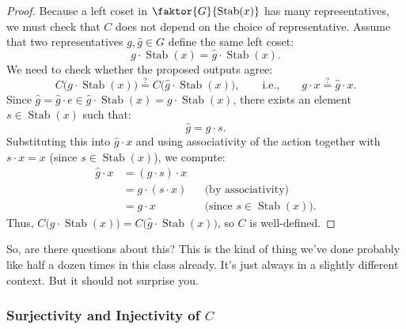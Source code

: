 \begin{proofWrapper}
\begin{content}
\begin{proof}
Because a left coset in $\faktor{G}{\operatorname{Stab}(x)}$ has many representatives, we must check that $C$ does not depend on the choice of representative. Assume that two representatives $g, \hat{g} \in G$ define the same left coset:
\[
g \cdot \operatorname{Stab}(x) = \hat{g} \cdot \operatorname{Stab}(x).
\]
We need to check whether the proposed outputs agree:
\[
C\bigl(g \cdot \operatorname{Stab}(x)\bigr) \stackrel{?}{=} C\bigl(\hat{g} \cdot \operatorname{Stab}(x)\bigr), \qquad \text{i.e.,} \qquad g \cdot x \stackrel{?}{=} \hat{g} \cdot x.
\]
Since $\hat{g} = \hat{g} \cdot e \in \hat{g} \cdot \operatorname{Stab}(x) = g \cdot \operatorname{Stab}(x)$, there exists an element $s \in \operatorname{Stab}(x)$ such that:
\[
\hat{g} = g \cdot s.
\]
Substituting this into $\hat{g} \cdot x$ and using associativity of the action together with $s \cdot x = x$ (since $s \in \operatorname{Stab}(x)$), we compute:
\begin{align*}
\hat{g} \cdot x &= (g \cdot s) \cdot x \\
&= g \cdot (s \cdot x) && \text{(by associativity)} \\
&= g \cdot x && \text{(since } s \in \operatorname{Stab}(x)\text{)}.
\end{align*}
Thus, $C\bigl(g \cdot \operatorname{Stab}(x)\bigr) = C\bigl(\hat{g} \cdot \operatorname{Stab}(x)\bigr)$, so $C$ is well-defined.
\end{proof}
\end{content}
\end{proofWrapper}

\begin{speech}[00:28:28 - 00:28:45]
So, are there questions about this? This is the kind of thing we've done probably like half a dozen times in this class already. It's just always in a slightly different context. But it should not surprise you.
\end{speech}

\begin{hidden}
\end{hidden}

\subsubsection{Surjectivity and Injectivity of \texorpdfstring{$C$}{C}}


